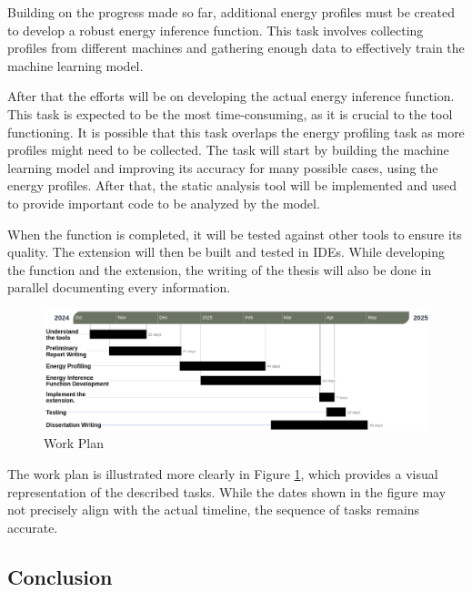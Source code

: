 \documentclass[sigplan]{acmart}
\begin{document}
Building on the progress made so far, additional energy profiles must be created to develop a robust energy inference function. This task involves collecting profiles from different machines and gathering enough data to effectively train the machine learning model.

After that the efforts will be on developing the actual energy inference function. This task is expected to be the most time-consuming, as it is crucial to the tool functioning. It is possible that this task overlaps the energy profiling task as more profiles might need to be collected. The task will start by building the machine learning model and improving its accuracy for many possible cases, using the energy profiles. After that, the static analysis tool will be implemented and used to provide important code to be analyzed by the model.

When the function is completed, it will be tested against other tools to ensure its quality. The extension will then be built and tested in IDEs.
While developing the function and the extension, the writing of the thesis will also be done in parallel documenting every information.

\begin{figure}%
  \centering
  \includegraphics[width = 1 \textwidth]{figures/gantt_diagram.png}
  \caption{Work Plan}
  \label{fig:gantt_diagram}
\end{figure}


The work plan is illustrated more clearly in Figure \ref{fig:gantt_diagram}, which provides a visual representation of the described tasks. While the dates shown in the figure may not precisely align with the actual timeline, the sequence of tasks remains accurate.

\subsection{Conclusion}
\end{document}
